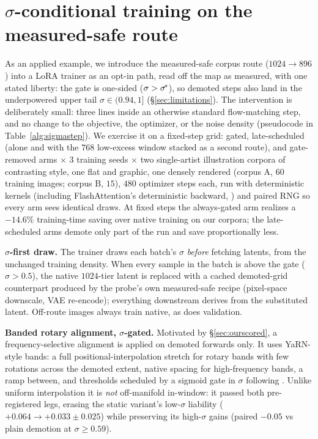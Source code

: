 \section{$\sigma$-conditional training on the measured-safe route}
\label{sec:practical}
\label{sec:trainer}

As an applied example, we introduce the measured-safe corpus route
($1024{\to}896$) into a LoRA \citep{hu2022lora} trainer as an opt-in
path, read off the map as measured, with one stated liberty: the
gate is one-sided ($\sigma > \sigma^{\!*}$), so demoted steps also land
in the underpowered upper tail $\sigma \in (0.94, 1]$
(\S\ref{sec:limitations}). The intervention is
deliberately small: three lines inside an otherwise standard
flow-matching step, and no change to the objective, the optimizer, or
the noise density (pseudocode in Table~\ref{alg:sigmastep}). We
exercise it on a fixed-step grid: gated, late-scheduled (alone and
with the $768$ low-excess window stacked as a second route), and
gate-removed
arms $\times$ $3$ training seeds $\times$ two single-artist
illustration corpora of contrasting style, one flat and graphic, one
densely rendered (corpus A, $60$ training images; corpus B, $15$),
$480$ optimizer steps each, run with deterministic kernels (including
FlashAttention's deterministic backward,
\citealp{dao2022flashattention}) and paired RNG so
every arm sees identical draws. At fixed steps the always-gated arm
realizes a $-14.6\%$ training-time saving over native training on our
corpora; the late-scheduled arms demote only part of the run and save
proportionally less.

\textbf{$\sigma$-first draw.} The trainer draws each batch's $\sigma$
\emph{before} fetching latents, from the unchanged training density.
When every sample
in the batch is above the gate ($\sigma > 0.5$), the native
$1024$-tier latent is replaced with a cached demoted-grid counterpart
produced by the probe's own measured-safe recipe (pixel-space
downscale, VAE re-encode); everything downstream derives from the
substituted latent. Off-route images always train native, as does
validation.

\textbf{Banded rotary alignment, $\sigma$-gated.} Motivated by
\S\ref{sec:ourscored}, a frequency-selective alignment is applied on
demoted forwards only. It uses YaRN-style bands: a full
positional-interpolation stretch for rotary bands with few rotations
across the demoted extent, native spacing for high-frequency bands, a
ramp between, and thresholds scheduled by a sigmoid gate in $\sigma$
following \citet{zhao2026sigma}. Unlike uniform interpolation it is
\emph{not} off-manifold in-window: it passed both pre-registered
legs, erasing the static variant's low-$\sigma$ liability
($+0.064 \to +0.033 \pm 0.025$) while preserving its high-$\sigma$
gains (paired $-0.05$ vs plain demotion at $\sigma \ge 0.59$).

